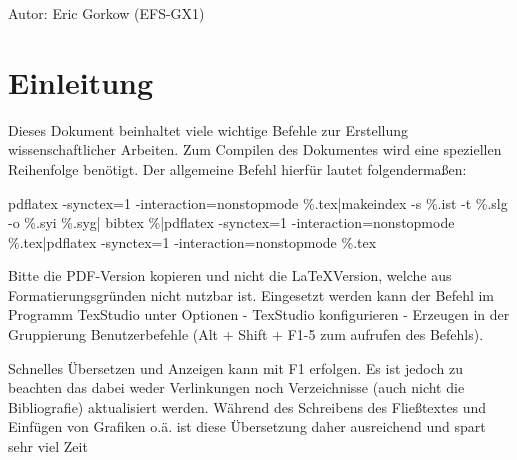 Autor: Eric Gorkow (EFS-GX1)
\chapter{Einleitung}
Dieses Dokument beinhaltet viele wichtige Befehle zur Erstellung wissenschaftlicher Arbeiten. Zum Compilen des Dokumentes wird eine speziellen Reihenfolge benötigt. Der allgemeine Befehl hierfür lautet folgendermaßen:

pdflatex -synctex=1 -interaction=nonstopmode \%.tex|makeindex -s \%.ist -t \%.slg -o \%.syi \%.syg| bibtex \%|pdflatex -synctex=1 -interaction=nonstopmode \%.tex|pdflatex -synctex=1 -interaction=nonstopmode \%.tex

Bitte die PDF-Version kopieren und nicht die \LaTeX Version, welche aus Formatierungsgründen nicht nutzbar ist. Eingesetzt werden kann der Befehl im Programm TexStudio unter Optionen - TexStudio konfigurieren - Erzeugen in der Gruppierung Benutzerbefehle (Alt + Shift + F1-5 zum aufrufen des Befehls).

Schnelles Übersetzen und Anzeigen kann mit F1 erfolgen. Es ist jedoch zu beachten das dabei weder Verlinkungen noch Verzeichnisse (auch nicht die Bibliografie) aktualisiert werden. Während des Schreibens des Fließtextes und Einfügen von Grafiken o.ä. ist diese Übersetzung daher ausreichend und spart sehr viel Zeit

